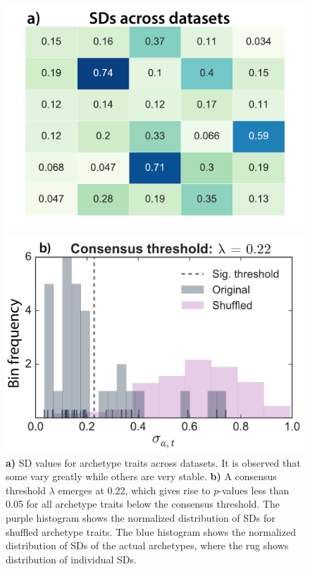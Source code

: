 \begin{figure}
	\centering
	\begin{minipage}[l]{0.45\textwidth}
		\centering
		\includegraphics[width=\textwidth]{figures/stdsAcrossDatasets}
	\end{minipage}
	\begin{minipage}[r]{0.52\textwidth}
		\centering
		\vspace{0.2cm}
		\includegraphics[width=\textwidth]{figures/varianceThreshold}
	\end{minipage}
	\vspace{-0.25cm}
	\caption{\label{fig:varianceThreshold} \textbf{a)} SD values for archetype traits across datasets.
	It is observed that some vary greatly while others are very stable. \textbf{b)} A consensus threshold $\lambda$ emerges at 0.22, which gives rise to $p$-values less than 0.05 for all archetype traits below the consensus threshold.
	The purple histogram shows the normalized distribution of SDs for shuffled archetype traits.
	The blue histogram shows the normalized distribution of SDs of the actual archetypes, where the rug shows distribution of individual SDs.}
\end{figure}

